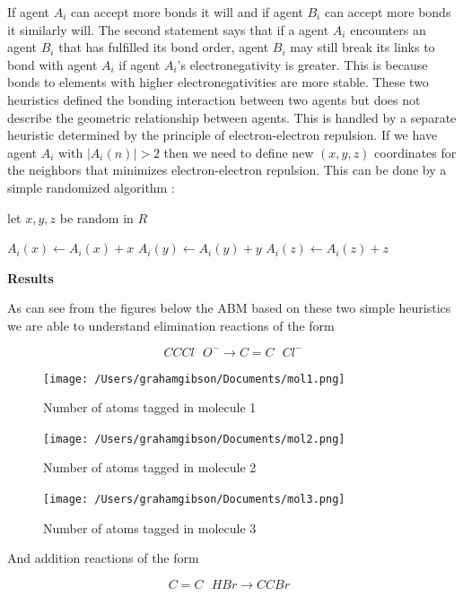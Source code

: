 \documentclass[aps,floatfix,prd,showpacs]{revtex4}
\begin{document}
  If agent $A_i$ can accept more bonds it will and if agent $B_i$ can accept more bonds it similarly will. 
  The second statement says that if a agent $A_i$ encounters an agent $B_i$ that has fulfilled its bond order, agent $B_i$ may still break its links to bond with agent $A_i$ if agent $A_i$'s electronegativity is greater. This is because bonds to elements with higher electronegativities are more stable. These two heuristics defined the bonding interaction between two agents but does not describe the geometric relationship between agents. This is handled by a separate heuristic determined by the principle of electron-electron repulsion. If we have agent $A_i$ with $|A_i(n)| > 2 $ then we need to define new $(x,y,z)$ coordinates for the neighbors that minimizes electron-electron repulsion. This can be done by a simple randomized algorithm :
  \begin{algorithmic}
  \State let $x,y,z$ be random in $R$
  
    \State $A_i(x) \gets A_i(x) + x$
     \State $A_i(y) \gets A_i(y) + y$
      \State $A_i(z) \gets A_i(z) + z$
\EndIf
\EndFor
\end{algorithmic}


\textbf{Results}


As can see from the figures below the ABM based on these two simple heuristics we are able to understand elimination reactions of the form 

$$CCCl \  \ \ O^- \rightarrow C=C \ \ \  Cl^- $$
\begin{figure}[ht]
\texttt{[image: /Users/grahamgibson/Documents/mol1.png]}
\caption{Number of atoms tagged in molecule 1}
\label{Elimination}
\end{figure}


\begin{figure}[ht]
\texttt{[image: /Users/grahamgibson/Documents/mol2.png]}
\caption{Number of atoms tagged in molecule 2}
\label{Elimination}
\end{figure}


\begin{figure}[ht]
\texttt{[image: /Users/grahamgibson/Documents/mol3.png]}
\caption{Number of atoms tagged in molecule 3}
\label{Elimination}
\end{figure}



And addition reactions of the form 

$$C=C \  \ \ HBr \rightarrow CCBr\ \ \  $$
\end{document}
